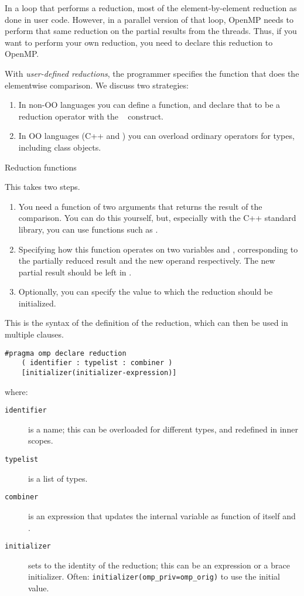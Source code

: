 In a loop that performs a reduction,
most of the element-by-element reduction as done in user code.
However, in a parallel version of that loop,
OpenMP needs to perform that same reduction on the partial results
from the threads.
Thus, if you want to perform your own reduction,
you need to declare this reduction to OpenMP.

With \emph{user-defined reductions}, the programmer specifies the
function that does the elementwise comparison.
We discuss two strategies:
\begin{enumerate}
\item In non-\ac{OO} languages you can define a function,
  and declare that to be a reduction operator with the
  ~ construct.
\item In \ac{OO} languages (C++ and )
  you can overload ordinary operators for types, including class objects.
\end{enumerate}

 {Reduction functions}

This takes two steps.
\begin{enumerate}
\item You need a function of two arguments that returns the result of
  the comparison. You can do this yourself, but, especially with the
  C++ standard library, you can use functions such as .
\item Specifying how this function operates on two variables
   and , corresponding to the
  partially reduced result and the new operand respectively. The new
  partial result should be left in .
\item Optionally, you can specify the value to which the reduction
  should be initialized.
\end{enumerate}

This is the syntax of the definition of the reduction, which can then
be used in multiple  clauses.
\begin{lstlisting}[language=omp]
#pragma omp declare reduction 
    ( identifier : typelist : combiner )
    [initializer(initializer-expression)]
\end{lstlisting}
where:
\begin{description}
  \item[\texttt{identifier}] is a name; this can be overloaded for
    different types, and redefined in inner scopes.
  \item[\texttt{typelist}] is a list of types.
  \item[\texttt{combiner}] is an expression that updates the internal
    variable  as function of itself and .
  \item[\texttt{initializer}] sets  to the
    identity of the reduction; this
    can be an expression or a brace initializer.
    Often: \lstinline{initializer(omp_priv=omp_orig)} to use the initial value.
\end{description}

